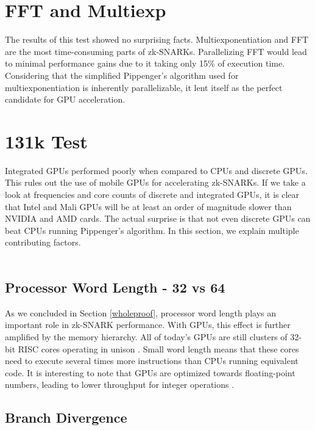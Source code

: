 \section{FFT and Multiexp}

The results of this test showed no surprising facts. Multiexponentiation and FFT are the most time-consuming parts of zk-SNARKs. Parallelizing FFT would lead to minimal performance gains due to it taking only 15\% of execution time. Considering that the simplified Pippenger's algorithm used for multiexponentiation is inherently parallelizable, it lent itself as the perfect candidate for GPU acceleration.

\section{131k Test}

Integrated GPUs performed poorly when compared to CPUs and discrete GPUs. This rules out the use of mobile GPUs for accelerating zk-SNARKs. If we take a look at frequencies and core counts of discrete and integrated GPUs, it is clear that Intel and Mali GPUs will be at least an order of magnitude slower than NVIDIA and AMD cards. The actual surprise is that not even discrete GPUs can beat CPUs running Pippenger's algorithm. In this section, we explain multiple contributing factors.\\
\\
\subsection{Processor Word Length - 32 vs 64}

As we concluded in Section \ref{wholeproof}, processor word length plays an important role in zk-SNARK performance. With GPUs, this effect is further amplified by the memory hierarchy. All of today's GPUs are still clusters of 32-bit RISC cores operating in unison \cite{nvidiapascalinstructions, amdpolarisinstructions}. Small word length means that these cores need to execute several times more instructions than CPUs running equivalent code. It is interesting to note that GPUs are optimized towards floating-point numbers, leading to lower throughput for integer operations \cite{nvidiathroughput}.\\

\subsection{Branch Divergence}

